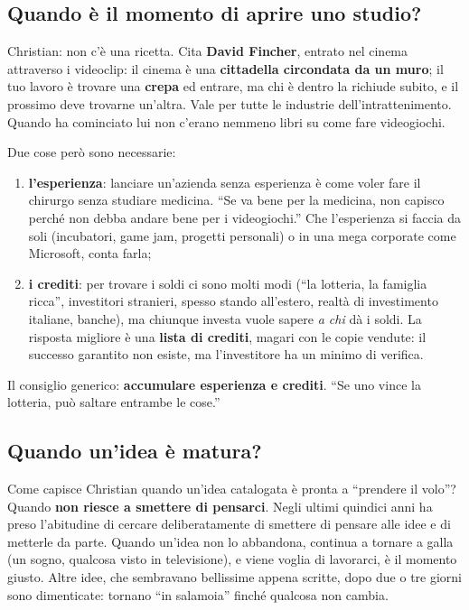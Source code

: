 \subsection{Quando è il momento di aprire uno studio?}

Christian: non c'è una ricetta. Cita \textbf{David Fincher}, entrato nel cinema
attraverso i videoclip: il cinema è una \textbf{cittadella circondata da un muro};
il tuo lavoro è trovare una \textbf{crepa} ed entrare, ma chi è dentro la richiude
subito, e il prossimo deve trovarne un'altra. Vale per tutte le industrie
dell'intrattenimento. Quando ha cominciato lui non c'erano nemmeno libri su come
fare videogiochi.

Due cose però sono necessarie:
\begin{enumerate}
  \item \textbf{l'esperienza}: lanciare un'azienda senza esperienza è come voler
        fare il chirurgo senza studiare medicina. ``Se va bene per la medicina, non
        capisco perché non debba andare bene per i videogiochi.'' Che l'esperienza
        si faccia da soli (incubatori, game jam, progetti personali) o in una mega
        corporate come Microsoft, conta farla;
  \item \textbf{i crediti}: per trovare i soldi ci sono molti modi (``la lotteria,
        la famiglia ricca'', investitori stranieri, spesso stando all'estero,
        realtà di investimento italiane, banche), ma chiunque investa vuole sapere
        \emph{a chi} dà i soldi. La risposta migliore è una \textbf{lista di
        crediti}, magari con le copie vendute: il successo garantito non esiste, ma
        l'investitore ha un minimo di verifica.
\end{enumerate}
Il consiglio generico: \textbf{accumulare esperienza e crediti}. ``Se uno vince la
lotteria, può saltare entrambe le cose.''

\subsection{Quando un'idea è matura?}

Come capisce Christian quando un'idea catalogata è pronta a ``prendere il volo''?
Quando \textbf{non riesce a smettere di pensarci}. Negli ultimi quindici anni ha
preso l'abitudine di cercare deliberatamente di smettere di pensare alle idee e di
metterle da parte. Quando un'idea non lo abbandona, continua a tornare a galla (un
sogno, qualcosa visto in televisione), e viene voglia di lavorarci, è il momento
giusto. Altre idee, che sembravano bellissime appena scritte, dopo due o tre giorni
sono dimenticate: tornano ``in salamoia'' finché qualcosa non cambia.

